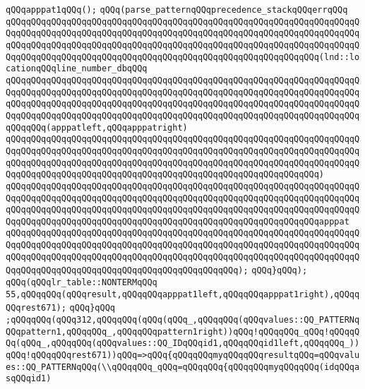 \verb|qQQqapppat1qQQq();|\newline
\verb|qQQq(parse_patternqQQqprecedence_stackqQQqerrqQQq|\newline
\verb|qQQqqQQqqQQqqQQqqQQqqQQqqQQqqQQqqQQqqQQqqQQqqQQqqQQqqQQqqQQqqQQqqQQqqQQqqQQqqQQqqQQqqQQqqQQqqQQqqQQqqQQqqQQqqQQqqQQqqQQqqQQqqQQqqQQqqQQqqQQqqQQqqQQqqQQqqQQqqQQqqQQqqQQqqQQqqQQqqQQqqQQqqQQqqQQqqQQqqQQqqQQqqQQqqQQqqQQqqQQqqQQqqQQqqQQqqQQqqQQqqQQqqQQqqQQqqQQqqQQqqQQqqQQqqQQq(lnd::locationqQQqline_number_dbqQQq|\newline
\verb|qQQqqQQqqQQqqQQqqQQqqQQqqQQqqQQqqQQqqQQqqQQqqQQqqQQqqQQqqQQqqQQqqQQqqQQqqQQqqQQqqQQqqQQqqQQqqQQqqQQqqQQqqQQqqQQqqQQqqQQqqQQqqQQqqQQqqQQqqQQqqQQqqQQqqQQqqQQqqQQqqQQqqQQqqQQqqQQqqQQqqQQqqQQqqQQqqQQqqQQqqQQqqQQqqQQqqQQqqQQqqQQqqQQqqQQqqQQqqQQqqQQqqQQqqQQqqQQqqQQqqQQqqQQqqQQqqQQqqQQqqQQqqQQq(apppatleft,qQQqapppatright)|\newline
\verb|qQQqqQQqqQQqqQQqqQQqqQQqqQQqqQQqqQQqqQQqqQQqqQQqqQQqqQQqqQQqqQQqqQQqqQQqqQQqqQQqqQQqqQQqqQQqqQQqqQQqqQQqqQQqqQQqqQQqqQQqqQQqqQQqqQQqqQQqqQQqqQQqqQQqqQQqqQQqqQQqqQQqqQQqqQQqqQQqqQQqqQQqqQQqqQQqqQQqqQQqqQQqqQQqqQQqqQQqqQQqqQQqqQQqqQQqqQQqqQQqqQQqqQQqqQQqqQQqqQQqqQQqqQQqqQQq)|\newline
\verb|qQQqqQQqqQQqqQQqqQQqqQQqqQQqqQQqqQQqqQQqqQQqqQQqqQQqqQQqqQQqqQQqqQQqqQQqqQQqqQQqqQQqqQQqqQQqqQQqqQQqqQQqqQQqqQQqqQQqqQQqqQQqqQQqqQQqqQQqqQQqqQQqqQQqqQQqqQQqqQQqqQQqqQQqqQQqqQQqqQQqqQQqqQQqqQQqqQQqqQQqqQQqqQQqqQQqqQQqqQQqqQQqqQQqqQQqqQQqqQQqqQQqqQQqqQQqqQQqqQQqqQQqqQQqqQQqapppat|\newline
\verb|qQQqqQQqqQQqqQQqqQQqqQQqqQQqqQQqqQQqqQQqqQQqqQQqqQQqqQQqqQQqqQQqqQQqqQQqqQQqqQQqqQQqqQQqqQQqqQQqqQQqqQQqqQQqqQQqqQQqqQQqqQQqqQQqqQQqqQQqqQQqqQQqqQQqqQQqqQQqqQQqqQQqqQQqqQQqqQQqqQQqqQQqqQQqqQQqqQQqqQQqqQQqqQQqqQQqqQQqqQQqqQQqqQQqqQQqqQQqqQQqqQQqqQQqqQQqqQQq);|\newline
\verb|qQQq}qQQq);|\newline
\verb|qQQq(qQQqlr_table::NONTERMqQQq|\newline
\verb|55,qQQqqQQq(qQQqresult,qQQqqQQqapppat1left,qQQqqQQqapppat1right),qQQqqQQqrest671);|\newline
\verb|qQQq}qQQq|\newline
\verb|;qQQqqQQq(qQQq312,qQQqqQQq(qQQq(qQQq_,qQQqqQQq(qQQqvalues::QQ_PATTERNqQQqpattern1,qQQqqQQq_,qQQqqQQqpattern1right))qQQq!qQQqqQQq_qQQq!qQQqqQQq(qQQq_,qQQqqQQq(qQQqvalues::QQ_IDqQQqid1,qQQqqQQqid1left,qQQqqQQq_))qQQq!qQQqqQQqrest671))qQQq=>qQQq{qQQqqQQqmyqQQqqQQqresultqQQq=qQQqvalues::QQ_PATTERNqQQq(\\qQQqqQQq_qQQq=qQQqqQQq{qQQqqQQqmyqQQqqQQq(idqQQqasqQQqid1)|\newline
